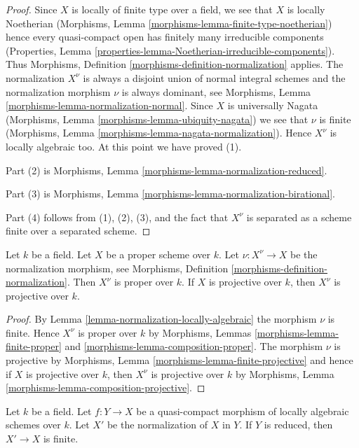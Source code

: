 \begin{proof}
Since $X$ is locally of finite type over a field, we see that
$X$ is locally Noetherian
(Morphisms, Lemma \ref{morphisms-lemma-finite-type-noetherian})
hence every quasi-compact open has finitely many irreducible
components (Properties, Lemma
\ref{properties-lemma-Noetherian-irreducible-components}).
Thus Morphisms, Definition \ref{morphisms-definition-normalization} applies.
The normalization $X^\nu$ is always a disjoint union of normal integral
schemes and the normalization morphism $\nu$ is always dominant, see
Morphisms, Lemma \ref{morphisms-lemma-normalization-normal}.
Since $X$ is universally Nagata
(Morphisms, Lemma \ref{morphisms-lemma-ubiquity-nagata})
we see that $\nu$ is finite
(Morphisms, Lemma \ref{morphisms-lemma-nagata-normalization}).
Hence $X^\nu$ is locally algebraic too.
At this point we have proved (1).

\medskip\noindent
Part (2) is Morphisms, Lemma \ref{morphisms-lemma-normalization-reduced}.

\medskip\noindent
Part (3) is Morphisms, Lemma \ref{morphisms-lemma-normalization-birational}.

\medskip\noindent
Part (4) follows from (1), (2), (3), and the fact that $X^\nu$ is
separated as a scheme finite over a separated scheme.
\end{proof}

\begin{lemma}
\label{lemma-normalize-projective}
Let $k$ be a field. Let $X$ be a proper scheme over $k$.
Let $\nu : X^\nu \to X$ be the normalization morphism, see
Morphisms, Definition \ref{morphisms-definition-normalization}.
Then $X^\nu$ is proper over $k$. If $X$ is projective over $k$,
then $X^\nu$ is projective over $k$.
\end{lemma}

\begin{proof}
By Lemma \ref{lemma-normalization-locally-algebraic} the morphism $\nu$
is finite. Hence $X^\nu$ is proper over $k$ by
Morphisms, Lemmas \ref{morphisms-lemma-finite-proper} and
\ref{morphisms-lemma-composition-proper}.
The morphism $\nu$ is projective by
Morphisms, Lemma \ref{morphisms-lemma-finite-projective}
and hence if $X$ is projective over $k$, then $X^\nu$ is projective over $k$
by Morphisms, Lemma \ref{morphisms-lemma-composition-projective}.
\end{proof}

\begin{lemma}
\label{lemma-relative-normalization-finite}
Let $k$ be a field. Let $f : Y \to X$ be a quasi-compact
morphism of locally algebraic schemes over $k$. Let $X'$
be the normalization of $X$ in $Y$. If $Y$ is reduced, then
$X' \to X$ is finite.
\end{lemma}

